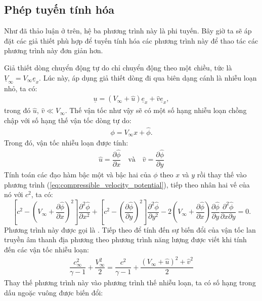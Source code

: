 \documentclass[../../DONG_CHAY_NEN_DUOC.tex]{subfiles}
\begin{document}
\subsection{Phép tuyến tính hóa}
	Như đã thảo luận ở trên, hệ ba phương trình này là phi tuyến. Bây giờ ta sẽ áp đặt các giả thiết phù hợp để tuyến tính hóa các phương trình này để thao tác các phương trình này đơn giản hơn.

	Giả thiết dòng chuyển động tự do chỉ chuyển động theo một chiều, tức là $\boxed{\underline{V}_\infty=V_\infty\underline{e}_x}$. Lúc này, áp dụng giả thiết dòng đi qua biên dạng cánh là nhiễu loạn nhỏ, ta có:
		\begin{align}
			\underline{u}=(V_\infty+\widehat{u})\underline{e}_x+\widehat{v}\underline{e}_x,
		\end{align}
	trong đó $\widehat{u}$, $\widehat{v}\ll V_\infty$. Thế vận tốc như vậy sẽ có một số hạng nhiễu loạn chồng chập với số hạng thế vận tốc dòng tự do:
		\begin{align}
			\phi=V_{\infty}x+\widehat{\phi}.
		\end{align}
	Trong đó, vận tốc nhiễu loạn được tính:
		\begin{align}
			\widehat{u}=\dfrac{\partial\widehat{\phi}}{\partial x}\quad\text{và}\quad\widehat{v}=\dfrac{\partial\widehat{\phi}}{\partial y}
		\end{align}
	Tính toán các đạo hàm bậc một và bậc hai của $\phi$ theo $x$ và $y$ rồi thay thế vào phương trình (\ref{eq:compressible_velocity_potential}), tiếp theo nhân hai vế của nó với $c^2$, ta có:
		\[
			\left[c^2-\left(V_\infty+\dfrac{\partial\widehat{\phi}}{\partial x}\right)^2\right]\dfrac{\partial^2\widehat{\phi}}{\partial x^2}+\left[c^2-\left(\dfrac{\partial\widehat{\phi}}{\partial y}\right)^2\right]\dfrac{\partial^2\widehat{\phi}}{\partial y^2}-2\left(V_\infty+\dfrac{\partial\widehat{\phi}}{\partial x}\right)\dfrac{\partial\widehat{\phi}}{\partial y}\dfrac{\partial^2\widehat{\phi}}{\partial x\partial y}=0.
		\]
		Phương trình này được gọi là . Tiếp theo để tính đến sự biến đổi của vận tốc lan truyền âm thanh địa phương theo phương trình năng lượng được viết khi tính đến các vận tốc nhiễu loạn:
		\begin{align}
			\dfrac{c_\infty^2}{\gamma-1}+\dfrac{V_\infty^2}{2}=\dfrac{c^2}{\gamma-1}+\dfrac{\left(V_\infty+\widehat{u}\right)^2+ \widehat{v}^2}{2}
		\end{align}
	Thay thế phương trình này vào phương trình thế nhiễu loạn, ta có số hạng trong dấu ngoặc vuông được biến đổi:
\end{document}
